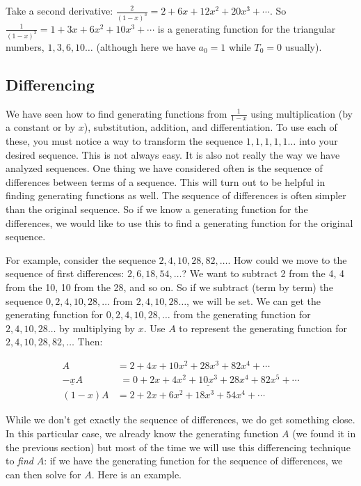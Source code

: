 \documentclass[12pt]{article}
\begin{document}
Take a second derivative: $\frac{2}{(1-x)^3} = 2 + 6x + 12x^2 + 20x^3 + \cdots$.  So $\frac{1}{(1-x)^3} = 1 + 3x + 6x^2 + 10x^3 + \cdots$ is a generating function for the triangular numbers, $1,3,6,10\ldots$ (although here we have $a_0 = 1$ while $T_0 = 0$ usually).




\subsection{Differencing}
We have seen how to find generating functions from $\frac{1}{1-x}$ using multiplication (by a constant or by $x$), substitution, addition, and differentiation.  To use each of these, you must notice a way to transform the sequence $1,1,1,1,1\ldots$ into your desired sequence.  This is not always easy.  It is also not really the way we have analyzed sequences.  One thing we have considered often is the sequence of differences between terms of a sequence.  This will turn out to be helpful in finding generating functions as well.  The sequence of differences is often simpler than the original sequence.  So if we know a generating function for the differences, we would like to use this to find a generating function for the original sequence.  
  
For example, consider the sequence $2, 4, 10, 28, 82, \ldots$.  How could we move to the sequence of first differences: $2, 6, 18, 54,\ldots$?  We want to subtract 2 from the 4, 4 from the 10, 10 from the 28, and so on.  So if we subtract (term by term) the sequence $0, 2, 4, 10, 28,\ldots$ from $2, 4, 10, 28\ldots$, we will be set.  We can get the generating function for $0,2,4,10,28,\ldots$ from the generating function for $2,4,10,28\ldots$ by multiplying by $x$.  Use $A$ to represent the generating function for $2, 4, 10, 28, 82, \ldots $  Then:

\begin{align*}
 A & = 2 + 4x + 10x^2 +28x^3 + 82x^4 + \cdots \\
 \underline{-xA} & \underline{\,\,= 0 + 2x + 4x^2 + 10x^3 + 28 x^4 + 82x^5 + \cdots} \\
 (1-x)A & = 2 + 2x + 6x^2 + 18x^3 + 54x^4 + \cdots
\end{align*}

While we don't get exactly the sequence of differences, we do get something close.  In this particular case, we already know the generating function $A$ (we found it in the previous section) but most of the time we will use this differencing technique to {\em find} $A$: if we have the generating function for the sequence of differences, we can then solve for $A$.  Here is an example.
\end{document}
